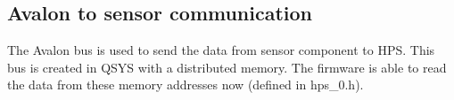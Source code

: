 \subsection{Avalon to sensor communication}
The Avalon bus is used to send the data from sensor component to HPS. This bus is created in QSYS with a distributed memory. The firmware is able to read the data from these memory addresses now (defined in hps\_0.h).


%

